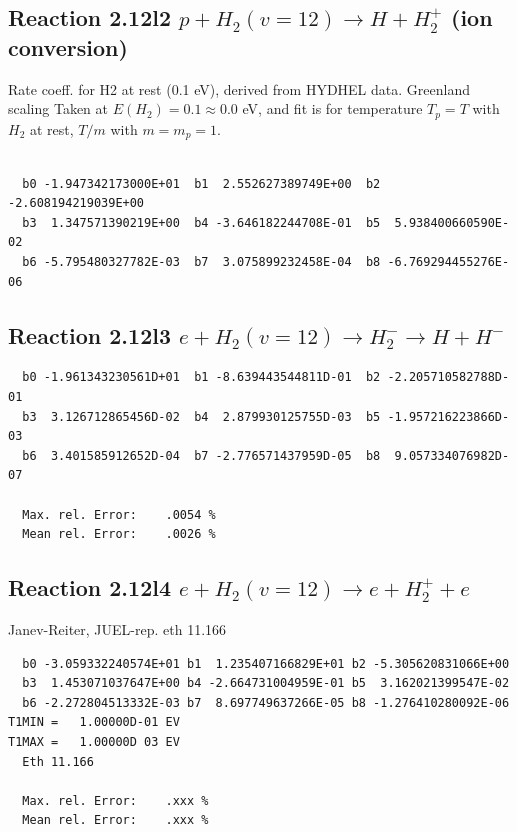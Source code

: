 \documentclass[12pt,dvipdfmx]{article}
\begin{document}
\subsection{
Reaction 2.12l2
$ p + H_2(v=12) \rightarrow H + H_2^+$ (ion conversion)
}
Rate coeff. for H2 at rest (0.1 eV), derived from HYDHEL data. Greenland scaling
Taken at $E(H_2) = 0.1 \approx 0.0$ eV,  and fit is for temperature $T_p=T$ with $H_2$ at rest,
$T/m$ with $m=m_p=1$.

\begin{small}\begin{verbatim}

  b0 -1.947342173000E+01  b1  2.552627389749E+00  b2 -2.608194219039E+00
  b3  1.347571390219E+00  b4 -3.646182244708E-01  b5  5.938400660590E-02
  b6 -5.795480327782E-03  b7  3.075899232458E-04  b8 -6.769294455276E-06

\end{verbatim}\end{small}

\newpage

\subsection{
Reaction 2.12l3
 $ e + H_2(v=12) \rightarrow H_2^- \rightarrow H + H^-$
}


\begin{small}\begin{verbatim}
  b0 -1.961343230561D+01  b1 -8.639443544811D-01  b2 -2.205710582788D-01
  b3  3.126712865456D-02  b4  2.879930125755D-03  b5 -1.957216223866D-03
  b6  3.401585912652D-04  b7 -2.776571437959D-05  b8  9.057334076982D-07

  Max. rel. Error:    .0054 %
  Mean rel. Error:    .0026 %
\end{verbatim}\end{small}

\subsection{
Reaction 2.12l4
 $ e + H_2(v=12) \rightarrow e + H_2^+  + e$
}
Janev-Reiter, JUEL-rep. eth 11.166

\begin{small}\begin{verbatim}
  b0 -3.059332240574E+01 b1  1.235407166829E+01 b2 -5.305620831066E+00
  b3  1.453071037647E+00 b4 -2.664731004959E-01 b5  3.162021399547E-02
  b6 -2.272804513332E-03 b7  8.697749637266E-05 b8 -1.276410280092E-06
T1MIN =   1.00000D-01 EV
T1MAX =   1.00000D 03 EV
  Eth 11.166

  Max. rel. Error:    .xxx %
  Mean rel. Error:    .xxx %
\end{verbatim}\end{small}
\end{document}
